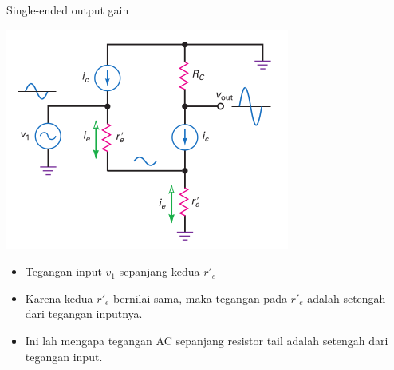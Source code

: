 \documentclass[aspectratio=169]{beamer}
\begin{document}
\begin{frame}{Single-ended output gain}
	\begin{multicols}{2}
		\begin{center}
			\includegraphics[height=0.7\textheight]{gambar/01.diff-amp/01.simplified_ac-equivalent_circuit}
		\end{center}
		\columnbreak
		\begin{itemize}
			\item Tegangan input $ v_1 $ sepanjang kedua $ r'_e $
			\item Karena kedua $ r'_e $ bernilai sama, maka tegangan pada $ r'_e $ adalah setengah dari tegangan inputnya.
			\item Ini lah mengapa tegangan AC sepanjang resistor tail adalah setengah dari tegangan input.
		\end{itemize}
	\end{multicols}
\end{frame}
\end{document}
